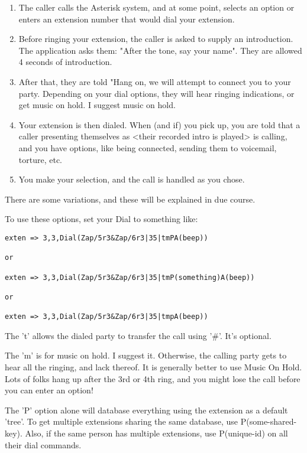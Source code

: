 \begin{enumerate}
\item The caller calls the Asterisk system, and at some point, selects an
option or enters an extension number that would dial your extension.

\item Before ringing your extension, the caller is asked to supply an
introduction. The application asks them: "After the tone, say your
name". They are allowed 4 seconds of introduction.

\item After that, they are told "Hang on, we will attempt to connect you
to your party. Depending on your dial options, they will hear ringing
indications, or get music on hold. I suggest music on hold.

\item Your extension is then dialed. When (and if) you pick up, you are
told that a caller presenting themselves as <their recorded intro is
played> is calling, and you have options, like being connected,
sending them to voicemail, torture, etc.

\item You make your selection, and the call is handled as you chose.
\end{enumerate}

There are some variations, and these will be explained in due course.


To use these options, set your Dial to something like:
\begin{verbatim}
exten => 3,3,Dial(Zap/5r3&Zap/6r3|35|tmPA(beep))

or 

exten => 3,3,Dial(Zap/5r3&Zap/6r3|35|tmP(something)A(beep))

or 

exten => 3,3,Dial(Zap/5r3&Zap/6r3|35|tmpA(beep))
\end{verbatim}

The 't' allows the dialed party to transfer the call using '\#'. It's
optional.

The 'm' is for music on hold. I suggest it. Otherwise, the calling
party gets to hear all the ringing, and lack thereof. It is generally
better to use Music On Hold. Lots of folks hang up after the 3rd or
4th ring, and you might lose the call before you can enter an option!

The 'P' option alone will database everything using the extension as a
default 'tree'. To get multiple extensions sharing the same database, use
P(some-shared-key). Also, if the same person has multiple extensions,
use P(unique-id) on all their dial commands.

